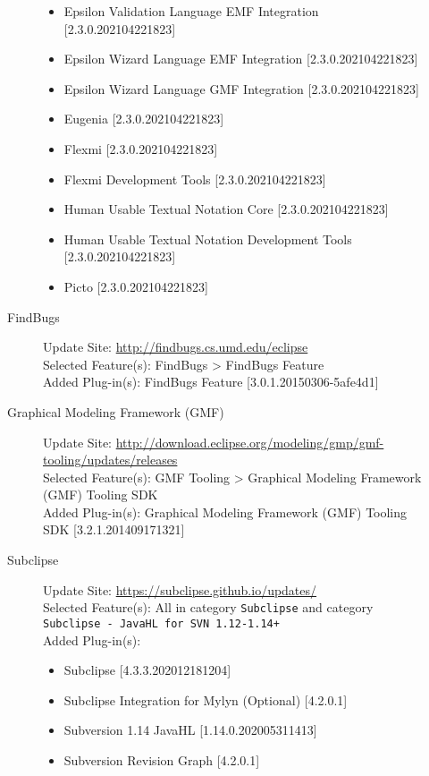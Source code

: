 \begin{description}
\begin{description}
\begin{itemize}
				\item Epsilon Validation Language EMF Integration [2.3.0.202104221823]
				\item Epsilon Wizard Language EMF Integration [2.3.0.202104221823]
				\item Epsilon Wizard Language GMF Integration [2.3.0.202104221823]
				\item Eugenia [2.3.0.202104221823]
				\item Flexmi [2.3.0.202104221823]
				\item Flexmi Development Tools [2.3.0.202104221823]
				\item Human Usable Textual Notation Core [2.3.0.202104221823]
				\item Human Usable Textual Notation Development Tools [2.3.0.202104221823]
				\item Picto [2.3.0.202104221823]
			\end{itemize}
			\item[FindBugs] $ $\\
			Update Site: \url{http://findbugs.cs.umd.edu/eclipse} \\
			Selected Feature(s): FindBugs > FindBugs Feature \\
			Added Plug-in(s): FindBugs Feature [3.0.1.20150306-5afe4d1]
			\item[Graphical Modeling Framework (GMF)] $ $\\
			Update Site: \url{http://download.eclipse.org/modeling/gmp/gmf-tooling/updates/releases} \\
			Selected Feature(s): GMF Tooling > Graphical Modeling Framework (GMF) Tooling SDK \\
			Added Plug-in(s): Graphical Modeling Framework (GMF) Tooling SDK [3.2.1.201409171321]
			\item[Subclipse] $ $\\
			Update Site: \url{https://subclipse.github.io/updates/} \\
			Selected Feature(s): All in category \texttt{Subclipse} and category \texttt{Subclipse - JavaHL for SVN 1.12-1.14+} \\
			Added Plug-in(s):
			\begin{itemize}
				\item Subclipse [4.3.3.202012181204]
				\item Subclipse Integration for Mylyn (Optional) [4.2.0.1]
				\item Subversion 1.14 JavaHL [1.14.0.202005311413]
				\item Subversion Revision Graph [4.2.0.1]

\end{itemize}
\end{description}
\end{description}
